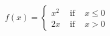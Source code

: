{${\displaystyle f(x) = \left\{ \begin{array}{rcl} x^2 & \mbox{ if } & x \leq 0 \\
                                                     2x & \mbox{ if } & x > 0
                                  \end{array} \right. }$}
{
\begin{center}
\end{center}
}